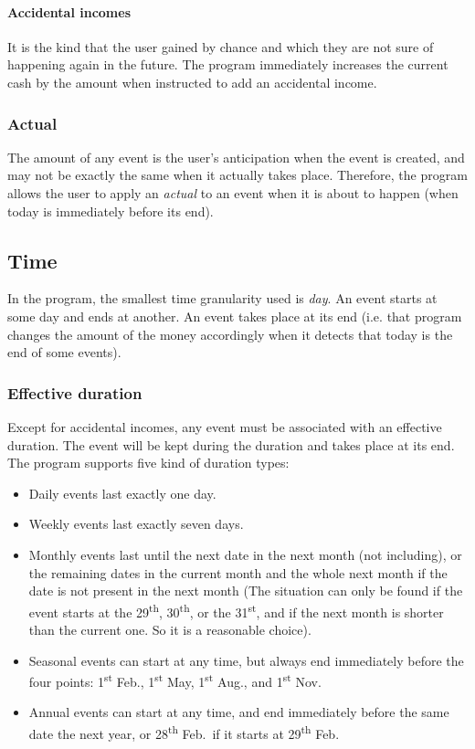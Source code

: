 \documentclass{article}
\begin{document}
\paragraph{Accidental incomes}
It is the kind that the user gained by chance and which they are not sure of happening again in the future. The program immediately increases the current cash by the amount when instructed to add an accidental income.

\subsubsection{Actual}
The amount of any event is the user's anticipation when the event is created, and may not be exactly the same when it actually takes place. Therefore, the program allows the user to apply an \emph{actual} to an event when it is about to happen (when today is immediately before its end).

\subsection{Time}
In the program, the smallest time granularity used is \emph{day}. An event starts at some day and ends at another. An event takes place at its end (i.e. that program changes the amount of the money accordingly when it detects that today is the end of some events).

\subsubsection{Effective duration}
Except for accidental incomes, any event must be associated with an effective duration. The event will be kept during the duration and takes place at its end. The program supports five kind of duration types:
\begin{itemize}
	\item Daily events last exactly one day. 
	\item Weekly events last exactly seven days.
	\item Monthly events last until the next date in the next month (not including), or the remaining dates in the current month and the whole next month if the date is not present in the next month (The situation can only be found if the event starts at the 29\textsuperscript{th}, 30\textsuperscript{th}, or the 31\textsuperscript{st}, and if the next month is shorter than the current one. So it is a reasonable choice).
	\item Seasonal events can start at any time, but always end immediately before the four points: 1\textsuperscript{st} Feb., 1\textsuperscript{st} May, 1\textsuperscript{st} Aug., and 1\textsuperscript{st} Nov.
	\item Annual events can start at any time, and end immediately before the same date the next year, or 28\textsuperscript{th} Feb.~if it starts at 29\textsuperscript{th} Feb.
\end{itemize}
\end{document}
